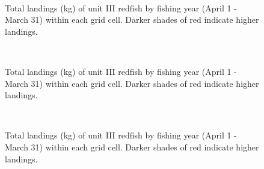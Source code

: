 \documentclass[11pt]{article}
\newcommand{\D}{.}
\newcommand{\e}{/home/ecomod_data/redfish/figures/}
\begin{document}
\begin{landscape}
\begin{figure}
\centering
{}
\\
\caption{Total landings (kg) of unit III redfish by fishing year (April 1 - March 31) within each grid cell. Darker shades of red indicate higher landings.}
\end{figure}
\clearpage

\begin{figure}
\centering
{}
\\
\caption{Total landings (kg) of unit III redfish by fishing year (April 1 - March 31) within each grid cell. Darker shades of red indicate higher landings.}
\end{figure}
\clearpage

\begin{figure}
\centering
{}
\\
\caption{Total landings (kg) of unit III redfish by fishing year (April 1 - March 31) within each grid cell. Darker shades of red indicate higher landings.}
\end{figure}
\clearpage
\end{landscape}
\end{document}
